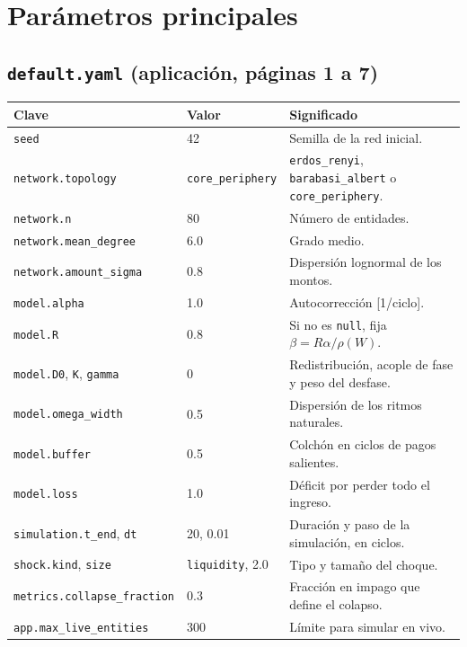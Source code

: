 \section{Parámetros principales}

\subsection*{\texttt{default.yaml} (aplicación, páginas 1 a 7)}
\begin{longtable}{L{0.34\textwidth}L{0.2\textwidth}L{0.38\textwidth}}
\toprule
\textbf{Clave} & \textbf{Valor} & \textbf{Significado} \\
\midrule
\endhead
\texttt{seed} & 42 & Semilla de la red inicial. \\
\texttt{network.topology} & \texttt{core\_\-periphery} & \texttt{erdos\_renyi},
\texttt{barabasi\_albert} o \texttt{core\_periphery}. \\
\texttt{network.n} & 80 & Número de entidades. \\
\texttt{network.mean\_degree} & 6.0 & Grado medio. \\
\texttt{network.amount\_sigma} & 0.8 & Dispersión lognormal de los montos. \\
\texttt{model.alpha} & 1.0 & Autocorrección [1/ciclo]. \\
\texttt{model.R} & 0.8 & Si no es \texttt{null}, fija $\beta=R\alpha/\rho(W)$. \\
\texttt{model.D0}, \texttt{K}, \texttt{gamma} & 0 & Redistribución, acople de fase y
peso del desfase. \\
\texttt{model.omega\_width} & 0.5 & Dispersión de los ritmos naturales. \\
\texttt{model.buffer} & 0.5 & Colchón en ciclos de pagos salientes. \\
\texttt{model.loss} & 1.0 & Déficit por perder todo el ingreso. \\
\texttt{simulation.t\_end}, \texttt{dt} & 20, 0.01 & Duración y paso de la simulación,
en ciclos. \\
\texttt{shock.kind}, \texttt{size} & \texttt{liquidity}, 2.0 & Tipo y tamaño del choque. \\
\texttt{metrics.collapse\_fraction} & 0.3 & Fracción en impago que define el colapso. \\
\texttt{app.max\_live\_entities} & 300 & Límite para simular en vivo. \\
\bottomrule
\end{longtable}

